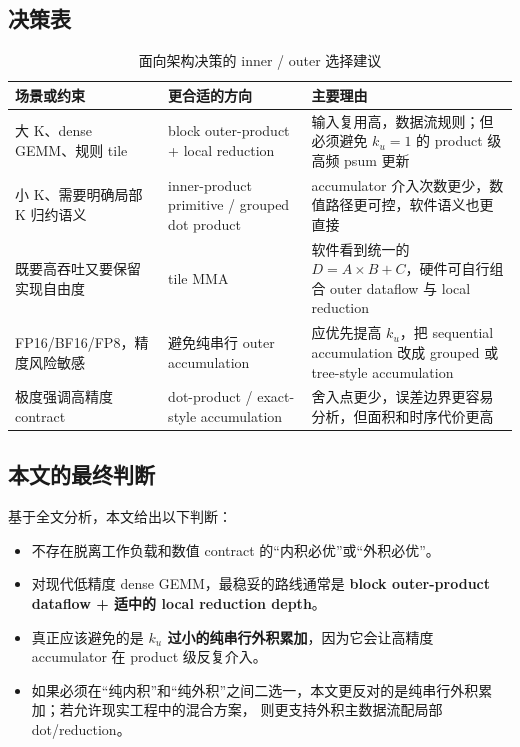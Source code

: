 \documentclass[UTF8,11pt,a4paper]{ctexart}
\newcommand{\ku}{\ensuremath{k_u}}
\begin{document}
\subsection{决策表}

\begin{table}[H]
  \centering
  \caption{面向架构决策的 inner / outer 选择建议}
  \label{tab:decision-new}
  \begin{tabularx}{\textwidth}{>{\raggedright\arraybackslash}p{3.0cm} >{\raggedright\arraybackslash}p{3.3cm} >{\raggedright\arraybackslash}X}
    \toprule
    场景或约束 & 更合适的方向 & 主要理由 \\
    \midrule
    大 K、dense GEMM、规则 tile & block outer-product + local reduction & 输入复用高，数据流规则；但必须避免 $\ku=1$ 的 product 级高频 psum 更新 \\
    小 K、需要明确局部 K 归约语义 & inner-product primitive / grouped dot product & accumulator 介入次数更少，数值路径更可控，软件语义也更直接 \\
    既要高吞吐又要保留实现自由度 & tile MMA & 软件看到统一的 $D=A\times B+C$，硬件可自行组合 outer dataflow 与 local reduction \\
    FP16/BF16/FP8，精度风险敏感 & 避免纯串行 outer accumulation & 应优先提高 \ku{}，把 sequential accumulation 改成 grouped 或 tree-style accumulation \\
    极度强调高精度 contract & dot-product / exact-style accumulation & 舍入点更少，误差边界更容易分析，但面积和时序代价更高 \\
    \bottomrule
  \end{tabularx}
\end{table}

\subsection{本文的最终判断}

基于全文分析，本文给出以下判断：

\begin{itemize}
  \item 不存在脱离工作负载和数值 contract 的“内积必优”或“外积必优”。
  \item 对现代低精度 dense GEMM，最稳妥的路线通常是 \textbf{block outer-product dataflow + 适中的 local reduction depth}。
  \item 真正应该避免的是 \textbf{\ku{} 过小的纯串行外积累加}，因为它会让高精度 accumulator 在 product 级反复介入。
  \item 如果必须在“纯内积”和“纯外积”之间二选一，本文更反对的是纯串行外积累加；若允许现实工程中的混合方案，
  则更支持外积主数据流配局部 dot/reduction。
\end{itemize}
\end{document}
